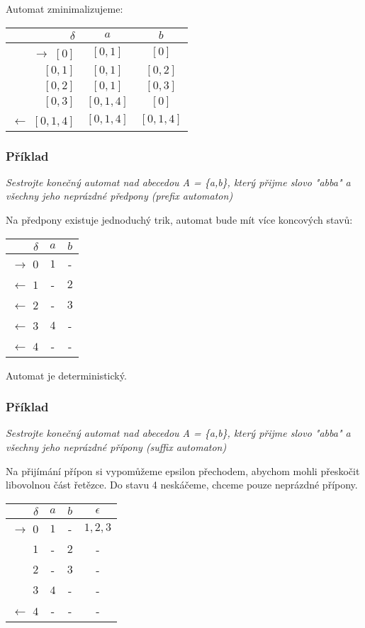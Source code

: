 \documentclass{article}
\begin{document}
Automat zminimalizujeme:

\begin{tabular}{|r||c|c|}
\hline
 $\delta$ &      $a$ &   $b$\\
\hline
\hline
$\rightarrow$ $[0]$ &   $[0,1]$ &       $[0]$\\
$[0,1]$ &       $[0,1]$ &       $[0,2]$\\
$[0,2]$ &       $[0,1]$ &       $[0,3]$\\
$[0,3]$ &       $[0,1,4]$ &     $[0]$\\
$\leftarrow$ $[0,1,4]$ &        $[0,1,4]$ &     $[0,1,4]$\\
\hline
\end{tabular}

\subsubsection{Příklad}
\label{prefix}
\emph{
Sestrojte konečný automat nad abecedou A = \{a,b\}, který přijme slovo "abba" a všechny jeho neprázdné předpony (prefix automaton)
}

Na předpony existuje jednoduchý trik, automat bude mít více koncových stavů:

\begin{tabular}{|r||c|c|}
\hline
 $\delta$ &      $a$ &   $b$\\
\hline
\hline
$\rightarrow$ $0$ &     $1$ &   -\\
$\leftarrow$ $1$ &      - &     $2$\\
$\leftarrow$ $2$ &      - &     $3$\\
$\leftarrow$ $3$ &      $4$ &   -\\
$\leftarrow$ $4$ &      - &     -\\
\hline
\end{tabular}

Automat je deterministický.

\subsubsection{Příklad}
\emph{
Sestrojte konečný automat nad abecedou A = \{a,b\}, který přijme slovo "abba" a všechny jeho neprázdné přípony (suffix automaton)
}

Na přijímání přípon si vypomůžeme epsilon přechodem, abychom mohli přeskočit libovolnou část řetězce. Do stavu 4 neskáčeme, chceme pouze neprázdné přípony.

\begin{tabular}{|r||c|c|c|}
\hline
 $\delta$ &      $a$ &   $b$ &   $\epsilon$\\
\hline
\hline
$\rightarrow$ $0$ &     $1$ &   - &     $1,2,3$\\
$1$ &   - &     $2$ &   -\\
$2$ &   - &     $3$ &   -\\
$3$ &   $4$ &   - &     -\\
$\leftarrow$ $4$ &      - &     - &     -\\
\hline
\end{tabular}
\end{document}
